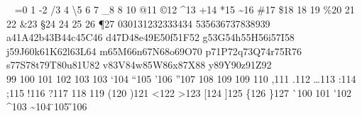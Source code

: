 \def\@csviter #1#2,{%
  \begingroup%
    \def\@tempa{#2}%
    \expandafter%
  \endgroup%
  \ifx\@tempa\sentinel%
    \expandafter\rem%
  \fi%
  #1{#2}%
  \@csviter#1%
}%
%
\newif\ifle \lefalse%
\def\@code{@code:}%
\def\@codename{\@code\string}%
\def\@tr{@tr:}%
\def\@trname{\@tr\meaning}%
\def\@def@code #1#2{\applycw\chardef{\@codename#1}=#2\relax}%
\def\@def@tr #1#2{\applycw\def{\@trname#1}{#2}}%
\def\@tt@space{\noexpand\@tt@space}%
\def\@tt@punct{\noexpand\@tt@punct}%
\def\@def@code@table #1#2{%
  \ifx#1\sentinel\else%
    \@def@code{#1}{#2}%
    \expandafter\@def@code@table%
  \fi%
}%
\def\@def@tr@table #1#2{%
  \ifx#1\sentinel\else%
    \@def@tr{#1}{\addtoks\@tempb{#2}}%
    \expandafter\@def@tr@table%
  \fi%
}%
\let\@ml@f\relax%
\@def@code@table%
  {\ }{0}%
  {\textvisiblespace}{1}%
  {-}{2}%
  {\slash}{3}%
  {\textbar}{4}%
  {\textbackslash}{5}%
  {\textendash}{6}%
  {\textemdash}{7}%
  {\_}{8}%
  {\textunderscore}{8}%
  {\Orb}{10}%
  {@}{11}%
  {\copyright}{12}%
  {\textasciicircum}{13}%
  {+}{14}%
  {*}{15}%
  {\textasciitilde}{16}%
  {\#}{17}%
  {\$}{18}%
  {\textdollar}{18}%
  {\textsterling}{19}%
  {\%}{20}%
  {\textperthousand}{21}%
  {\textpertenthousand}{22}%
  {\&}{23}%
  {\S}{24}%
  {\textsection}{24}%
  {\dag}{25}%
  {\ddag}{26}%
  {\P}{27}%
  {0}{30}{1}{31}{2}{32}{3}{33}{4}{34}%
  {5}{35}{6}{36}{7}{37}{8}{38}{9}{39}%
  {a}{41}{A}{42}{b}{43}{B}{44}{c}{45}{C}{46}%
  {d}{47}{D}{48}{e}{49}{E}{50}{f}{51}{F}{52}%
  {g}{53}{G}{54}{h}{55}{H}{56}{i}{57}{I}{58}%
  {j}{59}{J}{60}{k}{61}{K}{62}{l}{63}{L}{64}%
  {m}{65}{M}{66}{n}{67}{N}{68}{o}{69}{O}{70}%
  {p}{71}{P}{72}{q}{73}{Q}{74}{r}{75}{R}{76}%
  {s}{77}{S}{78}{t}{79}{T}{80}{u}{81}{U}{82}%
  {v}{83}{V}{84}{w}{85}{W}{86}{x}{87}{X}{88}%
  {y}{89}{Y}{90}{z}{91}{Z}{92}{\\}{99}%
  {\quotesinglbase}{100}%
  {\quotedblbase}{101}%
  {\guilsinglleft}{102}%
  {\guillemetleft}{103}%
  {\guillemotleft}{103}%
  {\textquoteleft}{104}%
  {\textquotedblleft}{105}%
  {\textquoteright}{106}%
  {\textquotedblright}{107}%
  {\guilsinglright}{108}%
  {\guillemetright}{109}%
  {\guillemotright}{109}%
  {\textquotedbl}{110}%
  {,}{111}%
  {.}{112}%
  {\dots}{113}%
  {:}{114}%
  {;}{115}%
  {!}{116}%
  {?}{117}%
  {\textexclamdown}{118}%
  {\textquestiondown}{119}%
  {(}{120}%
  {)}{121}%
  {<}{122}%
  {>}{123}%
  {[}{124}%
  {]}{125}%
  {\{}{126}%
  {\}}{127}%
  {\`}{100}%
  {\textcommaabove}{101}%
  {\'}{102}%
  {\^}{103}%
  {\~}{104}%
  {\"}{105}%
  {\H}{106}%
